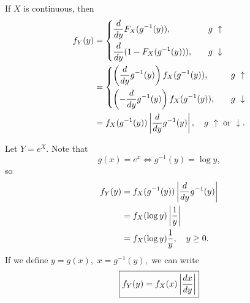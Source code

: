 \begin{remark}
If $X$ is continuous, then
\begin{align*}
    f_Y(y)&=
    \begin{dcases}
    \der{y}F_X(g^{-1}(y)), \quad & g \ \uparrow \\
    \der{y}(1-F_X(g^{-1}(y))), \quad & g \ \downarrow
    \end{dcases} \\
    &=\begin{dcases}
    \left(\der{y}g^{-1}(y)\right)f_X(g^{-1}(y)), \quad & g \ \uparrow \\
    \left(-\der{y}g^{-1}(y)\right)f_X(g^{-1}(y)), \quad & g \ \downarrow 
    \end{dcases}\\
    &=f_X(g^{-1}(y))\left|\der{y}g^{-1}(y)\right|, \quad g \ \uparrow \text{ or } \downarrow.
\end{align*}

\end{remark}
\begin{eg}
Let $Y=e^X.$ Note that
$$
g(x)=e^x\iff g^{-1}(y)=\log y,
$$
so
\begin{align*}
    f_Y(y)&=f_X(g^{-1}(y))\left|\der{y}g^{-1}(y)\right| \\
    &= f_X(\log y) \left|\frac{1}{y}\right| \\
	&=f_X(\log y)\frac{1}{y}, \quad y\geq 0.
\end{align*}
If we define $y=g(x),$ $x=g^{-1}(y),$ we can write
$$
\boxed{f_Y(y)=f_X(x)\left|\der[x]{y}\right|}
$$
\end{eg}
